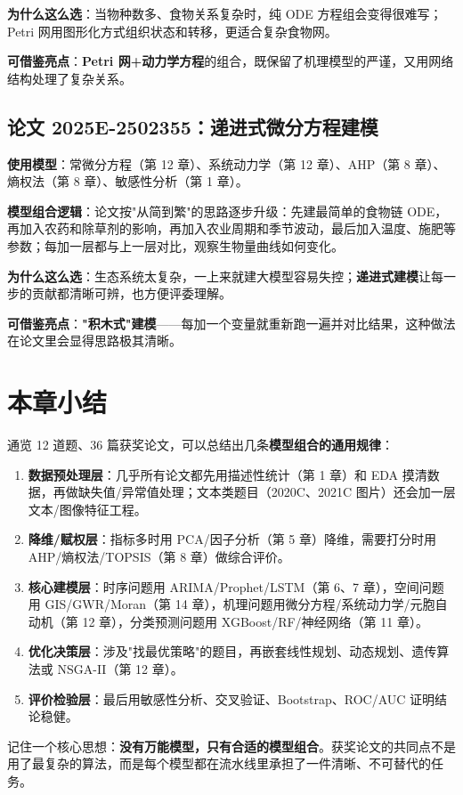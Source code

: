 \textbf{为什么这么选}：当物种数多、食物关系复杂时，纯 ODE 方程组会变得很难写；Petri 网用图形化方式组织状态和转移，更适合复杂食物网。

\textbf{可借鉴亮点}：\textbf{Petri 网+动力学方程}的组合，既保留了机理模型的严谨，又用网络结构处理了复杂关系。

\subsection{论文 2025E-2502355：递进式微分方程建模}
\textbf{使用模型}：常微分方程（第 12 章）、系统动力学（第 12 章）、AHP（第 8 章）、熵权法（第 8 章）、敏感性分析（第 1 章）。

\textbf{模型组合逻辑}：论文按"从简到繁"的思路逐步升级：先建最简单的食物链 ODE，再加入农药和除草剂的影响，再加入农业周期和季节波动，最后加入温度、施肥等参数；每加一层都与上一层对比，观察生物量曲线如何变化。

\textbf{为什么这么选}：生态系统太复杂，一上来就建大模型容易失控；\textbf{递进式建模}让每一步的贡献都清晰可辨，也方便评委理解。

\textbf{可借鉴亮点}：\textbf{"积木式"建模}——每加一个变量就重新跑一遍并对比结果，这种做法在论文里会显得思路极其清晰。

\section{本章小结}

通览 12 道题、36 篇获奖论文，可以总结出几条\textbf{模型组合的通用规律}：

\begin{enumerate}
  \item \textbf{数据预处理层}：几乎所有论文都先用描述性统计（第 1 章）和 EDA 摸清数据，再做缺失值/异常值处理；文本类题目（2020C、2021C 图片）还会加一层文本/图像特征工程。
  \item \textbf{降维/赋权层}：指标多时用 PCA/因子分析（第 5 章）降维，需要打分时用 AHP/熵权法/TOPSIS（第 8 章）做综合评价。
  \item \textbf{核心建模层}：时序问题用 ARIMA/Prophet/LSTM（第 6、7 章），空间问题用 GIS/GWR/Moran（第 14 章），机理问题用微分方程/系统动力学/元胞自动机（第 12 章），分类预测问题用 XGBoost/RF/神经网络（第 11 章）。
  \item \textbf{优化决策层}：涉及"找最优策略"的题目，再嵌套线性规划、动态规划、遗传算法或 NSGA-II（第 12 章）。
  \item \textbf{评价检验层}：最后用敏感性分析、交叉验证、Bootstrap、ROC/AUC 证明结论稳健。
\end{enumerate}

记住一个核心思想：\textbf{没有万能模型，只有合适的模型组合}。获奖论文的共同点不是用了最复杂的算法，而是每个模型都在流水线里承担了一件清晰、不可替代的任务。
